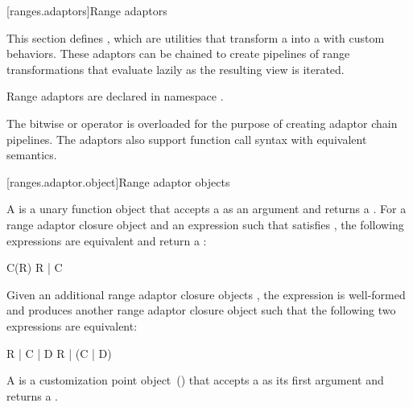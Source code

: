[ranges.adaptors]{Range adaptors}

\pnum
This section defines , which are utilities that transform a 
into a  with custom behaviors. These adaptors can be chained to create pipelines of
range transformations that evaluate lazily as the resulting view is iterated.

\pnum
Range adaptors are declared in namespace .

\pnum
The bitwise or operator is overloaded for the purpose of creating adaptor chain pipelines. The
adaptors also support function call syntax with equivalent semantics.

\pnum
\enterexample
{}
\exitexample

[ranges.adaptor.object]{Range adaptor objects}

\begin{addedblock}
\pnum
A  is a unary function object that accepts
a  as an argument and returns a . For a range
adaptor closure object  and an expression  such that
 satisfies , the following expressions
are equivalent and return a :

\begin{codeblock}
C(R)
R | C
\end{codeblock}

Given an additional range adaptor closure objects ,
the expression  is well-formed and produces another range adaptor
closure object such that the following two expressions are equivalent:

\begin{codeblock}
R | C | D
R | (C | D)
\end{codeblock}
\end{addedblock}

\pnum
A  is a customization point object~()
that accepts a  as its first
argument and  returns a .

